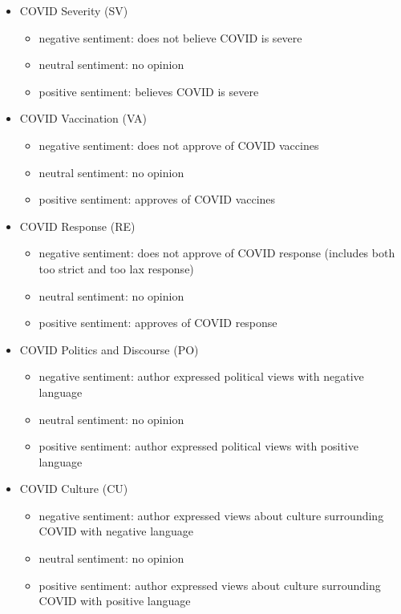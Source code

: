 \documentclass[letterpaper]{article} %
\begin{document}
\begin{itemize}
    \item COVID Severity (SV)
    \begin{itemize}
        \item negative sentiment: does not believe COVID is severe
        \item neutral sentiment: no opinion
        \item positive sentiment: believes COVID is severe
    \end{itemize}
    \item COVID Vaccination (VA) \begin{itemize}
        \item negative sentiment: does not approve of COVID vaccines
        \item neutral sentiment: no opinion
        \item positive sentiment: approves of COVID vaccines
    \end{itemize}
    \item COVID Response (RE)
    \begin{itemize}
        \item negative sentiment: does not approve of COVID response (includes both too strict and too lax response)
        \item neutral sentiment: no opinion
        \item positive sentiment: approves of COVID response
    \end{itemize}
    \item COVID Politics and Discourse (PO)
    \begin{itemize}
        \item negative sentiment: author expressed political views with negative language
        \item neutral sentiment: no opinion
        \item positive sentiment: author expressed political views with positive language
    \end{itemize}
    \item COVID Culture (CU)
    \begin{itemize}
        \item negative sentiment: author expressed views about culture surrounding COVID with negative language
        \item neutral sentiment: no opinion
        \item positive sentiment: author expressed views about culture surrounding COVID with positive language
    \end{itemize}
\end{itemize}
\end{document}
